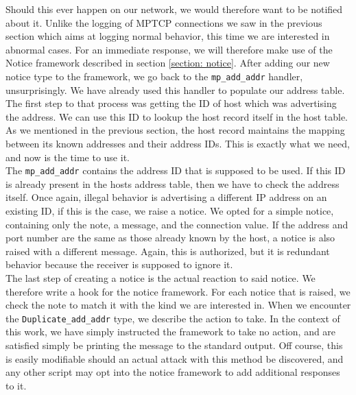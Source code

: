 Should this ever happen on our network, we would therefore want to be notified about it. Unlike the logging of MPTCP connections we saw in the previous section which aims at logging normal behavior, this time we are interested in abnormal cases. For an immediate response, we will therefore make use of the Notice framework described in section \ref{section: notice}. After adding our new notice type to the framework, we go back to the \texttt{mp\_add\_addr} handler, unsurprisingly. We have already used this handler to populate our address table. The first step to that process was getting the ID of host which was advertising the address. We can use this ID to lookup the host record itself in the host table. As we mentioned in the previous section, the host record maintains the mapping between its known addresses and their address IDs. This is exactly what we need, and now is the time to use it. \\

The \texttt{mp\_add\_addr} contains the address ID that is supposed to be used. If this ID is already present in the hosts address table, then we have to check the address itself. Once again, illegal behavior is advertising a different IP address on an existing ID, if this is the case, we raise a notice. We opted for a simple notice, containing only the note, a message, and the connection value. If the address and port number are the same as those already known by the host, a notice is also raised with a different message. Again, this is authorized, but it is redundant behavior because the receiver is supposed to ignore it. \\

The last step of creating a notice is the actual reaction to said notice. We therefore write a hook for the notice framework. For each notice that is raised, we check the note to match it with the kind we are interested in. When we encounter the \texttt{Duplicate\_add\_addr} type, we describe the action to take. In the context of this work, we have simply instructed the framework to take no action, and are satisfied simply be printing the message to the standard output. Off course, this is easily modifiable should an actual attack with this method be discovered, and any other script may opt into the notice framework to add additional responses to it.

\newpage
\clearpage
